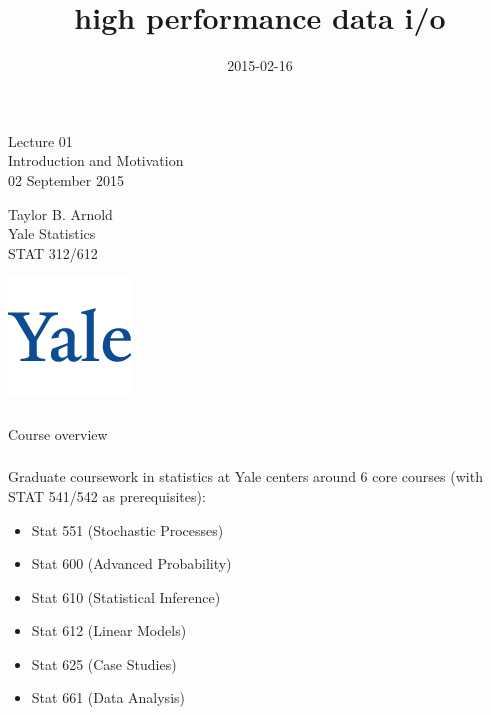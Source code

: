 

\title{high performance data i/o}
\date{2015-02-16}



\begin{frame}[fragile] \frametitle{}

\vfill

{\fontsize{0.7cm}{0cm}\selectfont Lecture 01 \\\vspace{0.2cm} Introduction and Motivation}\\\vspace{0.5cm}
02 September 2015

\vspace{2cm}

\begin{minipage}{0.6\textwidth}
Taylor B. Arnold \\
Yale Statistics \\
STAT 312/612
\end{minipage}
\hfill
\begin{minipage}{0.3\textwidth}\raggedleft
\includegraphics[scale=0.3]{../yale-logo.png}
\end{minipage}%

\end{frame}

\begin{frame}[fragile] \frametitle{}

\begin{flushright}
{\color{yaleblue}\sc\fontsize{1cm}{0cm}\selectfont Course overview}
\end{flushright}


\end{frame}

\begin{frame}[fragile] \frametitle{}

Graduate coursework in statistics at Yale centers
around 6 core courses (with STAT 541/542 as prerequisites):

\begin{itemize}
\item Stat 551 (Stochastic Processes)
\item Stat 600 (Advanced Probability)
\item Stat 610 (Statistical Inference)
\item Stat 612 (Linear Models)
\item Stat 625 (Case Studies)
\item Stat 661 (Data Analysis)
\end{itemize}

\end{frame}


